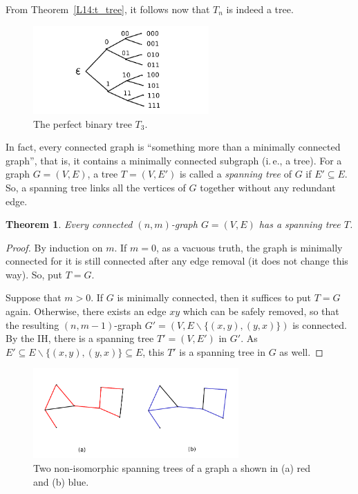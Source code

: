 \documentclass[12pt,notitlepage]{article}
\theoremstyle{plain}
\newtheorem{thm}{Theorem}[section]
\theoremstyle{definition}
\theoremstyle{plain}
\newcommand{\sbs}{\subseteq}
\renewcommand{\setminus}{\smallsetminus}
\newcommand{\1}{\mathbf{1}}
\newcommand{\0}{\mathbf{0}}
\begin{document}
From Theorem~\ref{L14:t_tree}, it follows now that $T_n$ is indeed a tree.

\begin{figure}[h]
\centering
\includegraphics*[width=0.6\textwidth]{graph_perf_tree.pdf}
\caption{The perfect binary tree $T_3$.}
\end{figure}

\medskip

In fact, every connected graph is ``something more than a minimally connected graph'', that is, it contains a minimally connected subgraph (i.\,e., a tree). For a graph $G = (V, E)$, a tree $T = (V, E')$ is called a \emph{spanning tree} of $G$ if $E' \sbs E$. So, a spanning tree links all the vertices of $G$ together without any redundant edge.

\begin{thm}\label{L14:t_spanning}
Every connected $(n,m)$-graph $G = (V, E)$ has a spanning tree $T$.
\end{thm} 
\begin{proof}
By induction on $m$. If $m = 0$, as a vacuous truth, the graph is minimally connected for it is still connected after any edge removal (it does not change this way). So, put $T = G$.

Suppose that $m > 0$. If $G$ is minimally connected, then it suffices to put $T = G$ again. Otherwise, there exists an edge $xy$ which can be safely removed, so that the resulting $(n, m - 1)$-graph $G' = (V, E \setminus \{(x,y), (y,x) \})$ is connected. By the IH, there is a spanning tree $T' = (V, E')$ in $G'$. As $E' \sbs E \setminus \{(x,y), (y,x) \} \sbs E$, this $T'$ is a spanning tree in $G$ as well.
\end{proof}

\begin{figure}[h]
\centering
\includegraphics*[width=0.7\textwidth]{graph_spanning.pdf}
\caption{Two non-isomorphic spanning trees of a graph a shown in (a) red and (b) blue.}
\end{figure}
\end{document}

